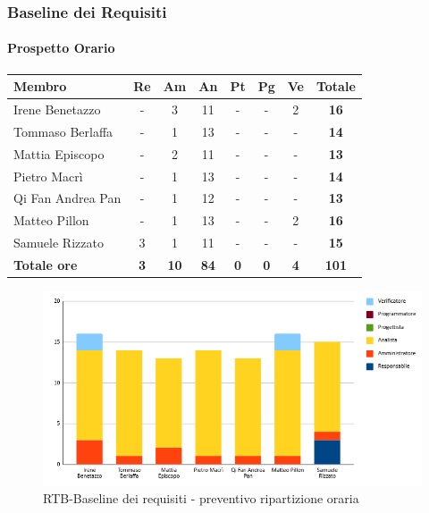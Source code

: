 \subsubsection{Baseline dei Requisiti}
\paragraph{Prospetto Orario}
\begin{center}
	\renewcommand{\arraystretch}{1.8} %
	\begin{tabular}{ |m{10em}|c|c|c|c|c|c|c| }
	\hline
	\textbf{Membro} & \textbf{Re} & \textbf{Am} &  \textbf{An} &  \textbf{Pt} &  \textbf{Pg} &  \textbf{Ve} &  \textbf{Totale}\\
    \hline
    Irene Benetazzo   & - & 3 & 11 & - & - & 2 & \textbf{16} \\
    \hline
    Tommaso Berlaffa  & - & 1 & 13 & - & - & - & \textbf{14} \\
    \hline
    Mattia Episcopo   & - & 2 & 11 & - & - & - & \textbf{13} \\
    \hline
    Pietro Macrì      & - & 1 & 13 & - & - & - & \textbf{14} \\
    \hline
    Qi Fan Andrea Pan & - & 1 & 12 & - & - & - & \textbf{13} \\
    \hline
    Matteo Pillon     & - & 1 & 13 & - & - & 2 & \textbf{16} \\
    \hline
    Samuele Rizzato   & 3 & 1 & 11 & - & - & - & \textbf{15} \\
    \hline
    \textbf{Totale ore} & \textbf{3} & \textbf{10} &  \textbf{84} &  \textbf{0} &  \textbf{0} &  \textbf{4} &  \textbf{101}\\
    \hline
	\end{tabular}
\end{center}
\begin{figure}[H]
    \centering\includegraphics[width=\textwidth, height=\textheight,keepaspectratio]{images/preventivo/RTB-requisiti-ore.png}
    \caption{RTB-Baseline dei requisiti - preventivo ripartizione oraria}
\end{figure}


